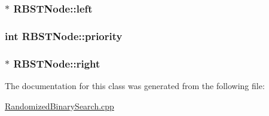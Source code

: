 \subsubsection[{\texorpdfstring{left}{left}}]{$\ast$ R\+B\+S\+T\+Node\+::left}\hypertarget{classRBSTNode_aaed05c0dc1229e3ac9bfd48ca1f34c84}{}\label{classRBSTNode_aaed05c0dc1229e3ac9bfd48ca1f34c84}
\subsubsection[{\texorpdfstring{priority}{priority}}]{\setlength{\rightskip}{0pt plus 5cm}int R\+B\+S\+T\+Node\+::priority}\hypertarget{classRBSTNode_a834716f43484069f09fb8fabf577b64e}{}\label{classRBSTNode_a834716f43484069f09fb8fabf577b64e}
\subsubsection[{\texorpdfstring{right}{right}}]{ $\ast$ R\+B\+S\+T\+Node\+::right}\hypertarget{classRBSTNode_a086e0e15cf51b06199e205eaeee17086}{}\label{classRBSTNode_a086e0e15cf51b06199e205eaeee17086}


The documentation for this class was generated from the following file\+:\begin{DoxyCompactItemize}
\item 
\hyperlink{RandomizedBinarySearch_8cpp}{Randomized\+Binary\+Search.\+cpp}\end{DoxyCompactItemize}
